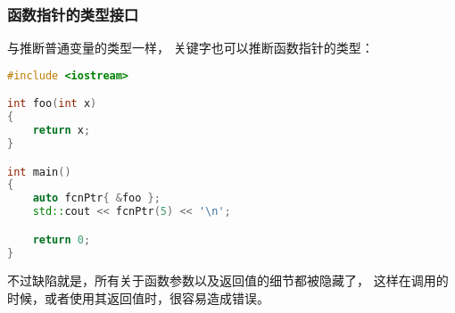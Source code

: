 \documentclass[../../LearnCpp.tex]{subfiles}
\begin{document}
\subsubsection*{函数指针的类型接口}

与推断普通变量的类型一样， 关键字也可以推断函数指针的类型：

\begin{lstlisting}[language=C++]
#include <iostream>

int foo(int x)
{
    return x;
}

int main()
{
    auto fcnPtr{ &foo };
    std::cout << fcnPtr(5) << '\n';

    return 0;
}
\end{lstlisting}

不过缺陷就是，所有关于函数参数以及返回值的细节都被隐藏了，
这样在调用的时候，或者使用其返回值时，很容易造成错误。
\end{document}
